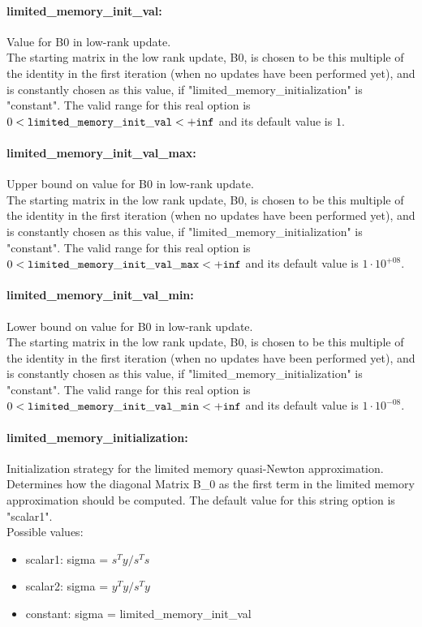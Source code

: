 \paragraph{limited\_memory\_init\_val:}\label{sec:limited_memory_init_val} Value for B0 in low-rank update. $\;$ \\
 The starting matrix in the low rank update, B0,
is chosen to be this multiple of the identity in
the first iteration (when no updates have been
performed yet), and is constantly chosen as this
value, if "limited\_memory\_initializat\-ion" is
"constant". The valid range for this real option is 
$0 <  {\tt limited\_memory\_init\_val } <  {\tt +inf}$
and its default value is $1$.


\paragraph{limited\_memory\_init\_val\_max:}\label{sec:limited_memory_init_val_max} Upper bound on value for B0 in low-rank update. $\;$ \\
 The starting matrix in the low rank update, B0,
is chosen to be this multiple of the identity in
the first iteration (when no updates have been
performed yet), and is constantly chosen as this
value, if "limited\_memory\_initializat\-ion" is
"constant". The valid range for this real option is 
$0 <  {\tt limited\_memory\_init\_val\_max } <  {\tt +inf}$
and its default value is $1 \cdot 10^{+08}$.


\paragraph{limited\_memory\_init\_val\_min:}\label{sec:limited_memory_init_val_min} Lower bound on value for B0 in low-rank update. $\;$ \\
 The starting matrix in the low rank update, B0,
is chosen to be this multiple of the identity in
the first iteration (when no updates have been
performed yet), and is constantly chosen as this
value, if "limited\_memory\_initializat\-ion" is
"constant". The valid range for this real option is 
$0 <  {\tt limited\_memory\_init\_val\_min } <  {\tt +inf}$
and its default value is $1 \cdot 10^{-08}$.


\paragraph{limited\_memory\_initialization:}\label{sec:limited_memory_initialization} Initialization strategy for the limited memory quasi-Newton approximation. $\;$ \\
 Determines how the diagonal Matrix B\_0 as the
first term in the limited memory approximation
should be computed.
The default value for this string option is "scalar1".
\\ 
Possible values:
\begin{itemize}
   \item scalar1: sigma = $s^Ty/s^Ts$
   \item scalar2: sigma = $y^Ty/s^Ty$
   \item constant: sigma = limited\_memory\_init\_val
\end{itemize}

